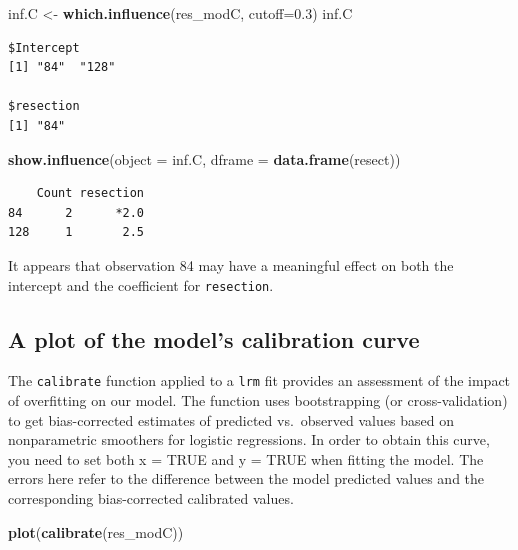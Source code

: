 \documentclass[]{book}
\newenvironment{Shaded}{\begin{snugshade}}{\end{snugshade}}
\newcommand{\KeywordTok}[1]{\textcolor[rgb]{0.13,0.29,0.53}{\textbf{#1}}}
\newcommand{\DataTypeTok}[1]{\textcolor[rgb]{0.13,0.29,0.53}{#1}}
\newcommand{\FloatTok}[1]{\textcolor[rgb]{0.00,0.00,0.81}{#1}}
\newcommand{\StringTok}[1]{\textcolor[rgb]{0.31,0.60,0.02}{#1}}
\newcommand{\NormalTok}[1]{#1}
\theoremstyle{definition}
\theoremstyle{definition}
\theoremstyle{definition}
\theoremstyle{remark}
\begin{document}
\begin{Shaded}
\begin{Highlighting}[]
\NormalTok{inf.C <-}\StringTok{ }\KeywordTok{which.influence}\NormalTok{(res_modC, }\DataTypeTok{cutoff=}\FloatTok{0.3}\NormalTok{)}
\NormalTok{inf.C}
\end{Highlighting}
\end{Shaded}

\begin{verbatim}
$Intercept
[1] "84"  "128"

$resection
[1] "84"
\end{verbatim}

\begin{Shaded}
\begin{Highlighting}[]
\KeywordTok{show.influence}\NormalTok{(}\DataTypeTok{object =}\NormalTok{ inf.C, }\DataTypeTok{dframe =} \KeywordTok{data.frame}\NormalTok{(resect))}
\end{Highlighting}
\end{Shaded}

\begin{verbatim}
    Count resection
84      2      *2.0
128     1       2.5
\end{verbatim}

It appears that observation 84 may have a meaningful effect on both the
intercept and the coefficient for \texttt{resection}.

\subsection{A plot of the model's calibration
curve}\label{a-plot-of-the-models-calibration-curve}

The \texttt{calibrate} function applied to a \texttt{lrm} fit provides
an assessment of the impact of overfitting on our model. The function
uses bootstrapping (or cross-validation) to get bias-corrected estimates
of predicted vs.~observed values based on nonparametric smoothers for
logistic regressions. In order to obtain this curve, you need to set
both x = TRUE and y = TRUE when fitting the model. The errors here refer
to the difference between the model predicted values and the
corresponding bias-corrected calibrated values.

\begin{Shaded}
\begin{Highlighting}[]
\KeywordTok{plot}\NormalTok{(}\KeywordTok{calibrate}\NormalTok{(res_modC))}
\end{Highlighting}
\end{Shaded}
\end{document}
